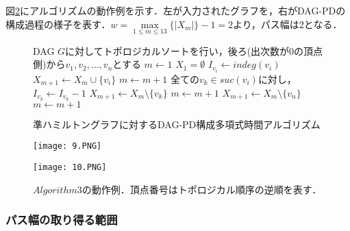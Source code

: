\documentclass{kuisthesis}           %
\begin{document}
 図\ref{fig:7}にアルゴリズムの動作例を示す．左が入力されたグラフを，右がDAG-PDの構成過程の様子を表す．$w= \underset{1\leq m \leq 13}{\max}\{|X_m|\}-1=2$より，パス幅は2となる．
 

 
 \begin{figure}[!t]
 \begin{algorithm}[H]
    \caption{準ハミルトングラフに対するDAG-PD構成多項式時間アルゴリズム}
    \label{alg3}
    \begin{algorithmic}[1]
    \State DAG $G$に対してトポロジカルソートを行い，後ろ(出次数が0の頂点側)から$v_1, v_2,   \ldots, v_n$とする
    \State $m \leftarrow 1$
    \State $X_1= \emptyset$
    \State $I_{v_i} \leftarrow indeg(v_i)$
    \EndFor
    \State $X_{m+1} \leftarrow X_m \cup \{v_i\}$
    \State $m \leftarrow m+1$
    \State 全ての$v_k \in suc(v_i)$に対し，$I_{v_k} \leftarrow I_{v_k}-1$
    \State $X_{m+1} \leftarrow X_m \setminus \{v_k\}$
    \State $m \leftarrow m+1$
    \EndWhile
    \State $X_{m+1} \leftarrow X_m \setminus \{v_n\}$
    \State $m \leftarrow m+1$
    \EndIf
    \EndFor
    \end{algorithmic}
 \end{algorithm}
 \end{figure}


     
 
 \begin{figure}[htbp]
  \begin{minipage}[b]{.5\linewidth}
    \centering
    \texttt{[image: 9.PNG]}
  \end{minipage}%
  \begin{minipage}[b]{.5\linewidth}
    \centering
    \texttt{[image: 10.PNG]}
  \end{minipage}
  \caption{$Algorithm3$の動作例．頂点番号はトポロジカル順序の逆順を表す．}
  \label{fig:7}
 \end{figure}


 \subsubsection{パス幅の取り得る範囲}
\end{document}
